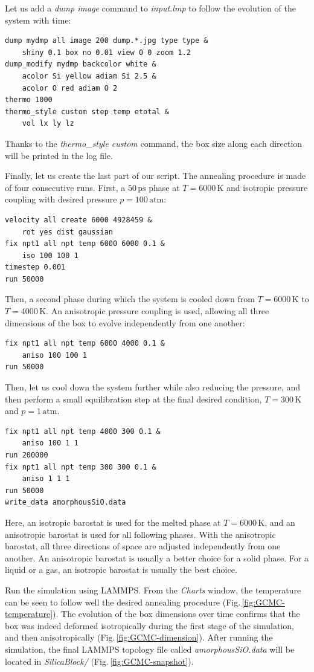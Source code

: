 \documentclass[9pt,tutorial]{livecoms}
\begin{document}
Let us add a \textit{dump image} command to \textit{input.lmp} to follow the
evolution of the system with time:
{\normalsize \begin{verbatim}
dump mydmp all image 200 dump.*.jpg type type &
    shiny 0.1 box no 0.01 view 0 0 zoom 1.2
dump_modify mydmp backcolor white &
    acolor Si yellow adiam Si 2.5 &
    acolor O red adiam O 2
thermo 1000
thermo_style custom step temp etotal &
    vol lx ly lz
\end{verbatim}}
Thanks to the \textit{thermo\_style custom} command, the box size along each direction
will be printed in the log file.

Finally, let us create the last part of our script. The annealing procedure is
made of four consecutive runs. First, a $50\,\text{ps}$ phase at $T = 6000\,\text{K}$
and isotropic pressure coupling with desired pressure $p = 100\,\text{atm}$:
{\normalsize \begin{verbatim}
velocity all create 6000 4928459 &
    rot yes dist gaussian
fix npt1 all npt temp 6000 6000 0.1 &
    iso 100 100 1
timestep 0.001
run 50000
\end{verbatim}}
Then, a second phase during which the system is cooled down from $T = 6000\,\text{K}$
to $T = 4000\,\text{K}$. An anisotropic pressure coupling is used, allowing all
three dimensions of the box to evolve independently from one another:
{\normalsize \begin{verbatim}
fix npt1 all npt temp 6000 4000 0.1 &
    aniso 100 100 1
run 50000
\end{verbatim}}
Then, let us cool down the system further while also reducing the pressure, and then
perform a small equilibration step at the final desired condition, $T = 300\,\text{K}$ and $p = 1\,\text{atm}$.
{\normalsize \begin{verbatim}
fix npt1 all npt temp 4000 300 0.1 &
    aniso 100 1 1
run 200000
fix npt1 all npt temp 300 300 0.1 &
    aniso 1 1 1
run 50000
write_data amorphousSiO.data
\end{verbatim}}
Here, an isotropic barostat is used for the melted phase at $T = 6000\,\text{K}$,
and an anisotropic barostat is used for all following phases. With the anisotropic
barostat, all three directions of space are adjusted independently from one another.
An anisotropic barostat is usually a better choice for a solid phase. For a liquid
or a gas, an isotropic barostat is usually the best choice.

Run the simulation using LAMMPS. From the \textit{Charts} window, the temperature
can be seen to follow well the desired annealing procedure (Fig.\,\ref{fig:GCMC-temperature}).
The evolution of the box dimensions over time confirms that the box was indeed
deformed isotropically during the first stage of the simulation, and then anisotropically
(Fig.\,\ref{fig:GCMC-dimension}). After running
the simulation, the final LAMMPS topology file called \textit{amorphousSiO.data}
will be located in \textit{SilicaBlock/} (Fig.\,\ref{fig:GCMC-snapshot}).
\end{document}
